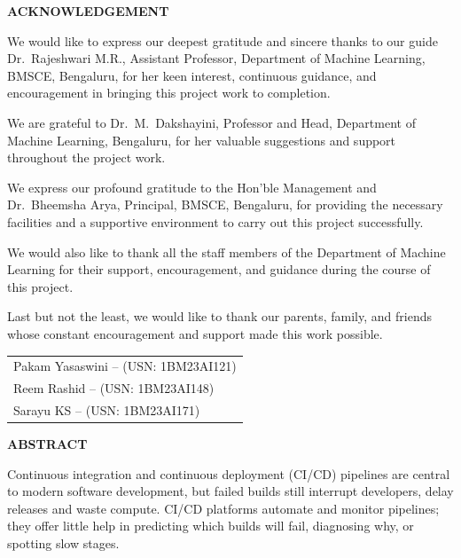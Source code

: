 \begin{center}\fontsize{14}{17}\selectfont\bfseries ACKNOWLEDGEMENT\end{center}
\label{fm:ack}
We would like to express our deepest gratitude and sincere thanks to our guide Dr.\ Rajeshwari M.R., Assistant Professor, Department of Machine Learning, BMSCE, Bengaluru, for her keen interest, continuous guidance, and encouragement in bringing this project work to completion.

We are grateful to Dr.\ M.\ Dakshayini, Professor and Head, Department of Machine Learning, Bengaluru, for her valuable suggestions and support throughout the project work.

We express our profound gratitude to the Hon'ble Management and Dr.\ Bheemsha Arya, Principal, BMSCE, Bengaluru, for providing the necessary facilities and a supportive environment to carry out this project successfully.

We would also like to thank all the staff members of the Department of Machine Learning for their support, encouragement, and guidance during the course of this project.

Last but not the least, we would like to thank our parents, family, and friends whose constant encouragement and support made this work possible.

\vspace{30pt}
\begin{flushright}
\begin{tabular}{@{}l@{}}
Pakam Yasaswini -- (USN: 1BM23AI121)\\
Reem Rashid -- (USN: 1BM23AI148)\\
Sarayu KS -- (USN: 1BM23AI171)
\end{tabular}
\end{flushright}
\clearpage

\begin{center}\fontsize{14}{17}\selectfont\bfseries ABSTRACT\end{center}
\label{fm:abstract}
Continuous integration and continuous deployment (CI/CD) pipelines are central to modern software development, but failed builds still interrupt developers, delay releases and waste compute. CI/CD platforms automate and monitor pipelines; they offer little help in predicting which builds will fail, diagnosing why, or spotting slow stages.

